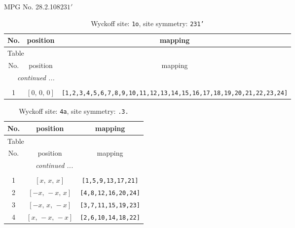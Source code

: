 \documentclass[fleqn,8pt]{jsarticle}
\begin{document}
\setcounter{MaxMatrixCols}{32}

\renewcommand{\tablename}{Table~}
\renewcommand{\figurename}{Figure~}
\begin{center}
\LARGE
MPG No. 28.2.108\quad$231'$
\end{center}
\renewcommand{\arraystretch}{1.2}
\begin{longtable}{ccc}
\caption{Wyckoff site: {\tt 1o}, site symmetry: {\tt 231'}}
 \\
 \hline \hline
No. & position & mapping \\ \hline \endfirsthead

\multicolumn{2}{l}{\tablename\ \thetable{}} \\
 \hline \hline
No. & position & mapping \\ \hline \endhead

 \hline \hline
\multicolumn{2}{r}{\footnotesize\it continued ...} \\ \endfoot

 \hline \hline
\multicolumn{2}{r}{} \\ \endlastfoot

1 & $\left[ 0,\, 0,\, 0 \right]$ & {\tt [1,2,3,4,5,6,7,8,9,10,11,12,13,14,15,16,17,18,19,20,21,22,23,24]} \\
\end{longtable}
\renewcommand{\arraystretch}{1.2}
\begin{longtable}{ccc}
\caption{Wyckoff site: {\tt 4a}, site symmetry: {\tt .3.}}
 \\
 \hline \hline
No. & position & mapping \\ \hline \endfirsthead

\multicolumn{2}{l}{\tablename\ \thetable{}} \\
 \hline \hline
No. & position & mapping \\ \hline \endhead

 \hline \hline
\multicolumn{2}{r}{\footnotesize\it continued ...} \\ \endfoot

 \hline \hline
\multicolumn{2}{r}{} \\ \endlastfoot

1 & $\left[ x,\, x,\, x \right]$ & {\tt [1,5,9,13,17,21]} \\ \hline
2 & $\left[ - x,\, - x,\, x \right]$ & {\tt [4,8,12,16,20,24]} \\ \hline
3 & $\left[ - x,\, x,\, - x \right]$ & {\tt [3,7,11,15,19,23]} \\ \hline
4 & $\left[ x,\, - x,\, - x \right]$ & {\tt [2,6,10,14,18,22]} \\
\end{longtable}
\end{document}
